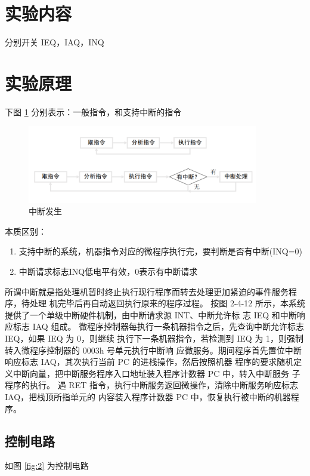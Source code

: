 \documentclass[a4paper,10pt,UTF8]{paper}
\numberwithin{equation}{section}
\numberwithin{figure}{section}
\begin{document}
\section{实验内容}

分别开关 IEQ，IAQ，INQ


\section{实验原理}

下图 \ref{fig:1} 分别表示：一般指令，和支持中断的指令

\begin{figure}[h]
	\centering
	\includegraphics[width=0.9\textwidth]{1.PNG}
	\caption{中断发生}
	\label{fig:1}
\end{figure}
本质区别：
\begin{enumerate}
	\item 支持中断的系统，机器指令对应的微程序执行完，要判断是否有中断(INQ=0)
	\item 中断请求标志INQ低电平有效，0表示有中断请求
\end{enumerate}

所谓中断就是指处理机暂时终止执行现行程序而转去处理更加紧迫的事件服务程序，待处理
机完毕后再自动返回执行原来的程序过程。
按图 2-4-12 所示，本系统提供了一个单级中断硬件机制，由中断请求源 INT、中断允许标
志 IEQ 和中断响应标志 IAQ 组成。
微程序控制器每执行一条机器指令之后，先查询中断允许标志 IEQ，如果 IEQ 为 0，则继续
执行下一条机器指令，若检测到 IEQ 为 1，则强制转入微程序控制器的 0003h 号单元执行中断响
应微服务。期间程序首先置位中断响应标志 IAQ，其次执行当前 PC 的进栈操作，然后按照机器
程序的要求随机定义中断向量，把中断服务程序入口地址装入程序计数器 PC 中，转入中断服务
子程序的执行。
遇 RET 指令，执行中断服务返回微操作，清除中断服务响应标志 IAQ，把栈顶所指单元的
内容装入程序计数器 PC 中，恢复执行被中断的机器程序。

\subsection{控制电路}

如图 \ref{fig:2} 为控制电路
\end{document}
